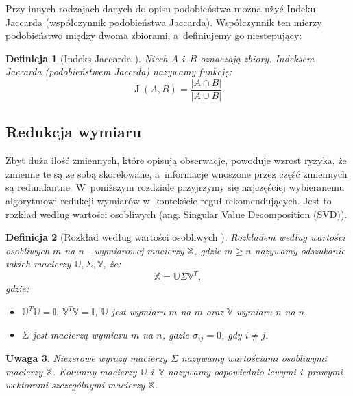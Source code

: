 \documentclass[12pt,a4paper]{report}
\newtheorem{df}{Definicja}[chapter]
\newtheorem{uwaga}[df]{Uwaga}
\newcommand{\J}[2]{\operatorname{J}\left({#1}, {#2} \right)}
\begin{document}
Przy innych rodzajach danych do opisu podobieństwa można użyć Indeku Jaccarda (współczynnik podobieństwa Jaccarda).  Współczynnik ten mierzy podobieństwo między dwoma zbiorami, a~definiujemy go niestepujący:

\begin{df}[Indeks Jaccarda  \citep{bre}]
Niech $\mathit{A}$ i~$\mathit{B}$ oznaczają zbiory. Indeksem Jaccarda (podobieństwem Jaccrda) nazywamy funkcję:
$$
\J{\mathit{A}}{\mathit{B}}=\frac{|\mathit{A}\cap \mathit{B}|}{|\mathit{A} \cup \mathit{B}|}.
$$
\end{df}

\subsection{Redukcja wymiaru}
Zbyt duża ilość zmiennych, które opisują obserwacje, powoduje wzrost ryzyka, że zmienne te są ze sobą skorelowane, a~informacje wnoszone przez część zmiennych są redundantne. W~poniższym rozdziale przyjrzymy się najczęściej wybieranemu algorytmowi redukcji wymiarów w~kontekście reguł rekomendujących. Jest to rozkład według wartości osobliwych (ang. Singular Value Decomposition (SVD)).

\begin{df} [Rozkład według wartości osobliwych {\citep{ulafiir}}]%
Rozkładem według wartości osobliwych $m$ na $n$ - wymiarowej macierzy $\mathbb{X}$, gdzie $m\geq n$ nazywamy odszukanie takich macierzy $\mathbb{U}, \Sigma, \mathbb{V}$, że:
$$
\mathbb{X}=\mathbb{U} \Sigma \mathbb{V}^T,
$$
gdzie:
\begin{itemize}
\item $\mathbb{U}^T \mathbb{U} =\mathbb{I}, \:  \mathbb{V}^T \mathbb{V} = \mathbb{I}$, $\mathbb{U}$ jest wymiaru $m$ na $m$ oraz $\mathbb{V}$ wymiaru $n$ na $n$,
\item $\Sigma$ jest macierzą wymiaru $m$ na $n$, gdzie $\sigma_{ij} = 0$, gdy $i \neq j$.	
\end{itemize}
\end{df}

\begin{uwaga}{\citep{ulafiir}}
Niezerowe wyrazy macierzy $\Sigma$ nazywamy wartościami osobliwymi macierzy $\mathbb{X}$.
Kolumny macierzy $\mathbb{U}$ i~$\mathbb{V}$ nazywamy odpowiednio lewymi i~prawymi wektorami szczególnymi macierzy $\mathbb{X}$.
\end{uwaga}
\end{document}
